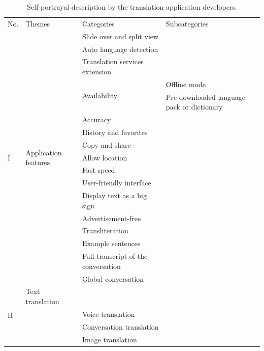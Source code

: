 \documentclass[english]{textolivre}
\begin{document}
\begin{longtable}{p{1cm} p{2.5cm} p{4.5cm} p{5cm}}
\caption{Self-portrayal description by the translation application developers.}
\label{tbl4}
\footnotesize
\\
\toprule
No. & Themes & Categories & Subcategories \\ 
\midrule
\multirow{17}{=}{I} & \multirow{17}{=}{Application features} & Slide over and split view & \cellcolor[HTML]{EFEFEF} \\
\cmidrule{3-4}
& & Auto language detection & \cellcolor[HTML]{EFEFEF} \\
\cmidrule{3-4}
& & Translation services extension & \cellcolor[HTML]{EFEFEF} \\
\cmidrule{3-4}
& & \multirow{2}{=}{Availability} & Offline mode \\
& & & Pre downloaded language pack or dictionary \\
\cmidrule{3-4}
& & Accuracy & \cellcolor[HTML]{EFEFEF} \\
\cmidrule{3-4}
& & History and favorites & \cellcolor[HTML]{EFEFEF} \\
\cmidrule{3-4}
& & Copy and share & \cellcolor[HTML]{EFEFEF} \\
\cmidrule{3-4}
& & Allow location & \cellcolor[HTML]{EFEFEF} \\
\cmidrule{3-4}
& & Fast speed & \cellcolor[HTML]{EFEFEF} \\
\cmidrule{3-4}
& & User-friendly interface & \cellcolor[HTML]{EFEFEF} \\
\cmidrule{3-4}
& & Display text as a big sign & \cellcolor[HTML]{EFEFEF} \\
\cmidrule{3-4}
& & Advertisement-free & \cellcolor[HTML]{EFEFEF} \\
\cmidrule{3-4}
& & Transliteration & \cellcolor[HTML]{EFEFEF} \\
\cmidrule{3-4}
& & Example sentences & \cellcolor[HTML]{EFEFEF} \\
\cmidrule{3-4}
& & Full transcript of the conversation & \cellcolor[HTML]{EFEFEF} \\
\cmidrule{3-4}
& & Global conversation & \cellcolor[HTML]{EFEFEF} \\
\midrule
\multirow{9}{=}{II} & Text translation & \cellcolor[HTML]{EFEFEF} \\
\cmidrule{3-4}
& & Voice translation & \cellcolor[HTML]{EFEFEF} \\
\cmidrule{3-4}
& & Conversation translation & \cellcolor[HTML]{EFEFEF} \\
\cmidrule{3-4}
& & Image translation & \cellcolor[HTML]{EFEFEF} \\

\end{longtable}
\end{document}
